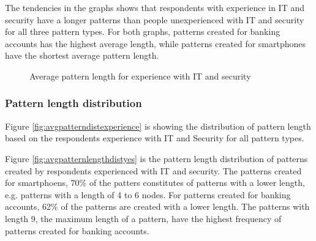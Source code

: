       The tendencies in the graphs shows that respondents with experience in IT and security have a longer patterns than people unexperienced with IT and security for all three pattern types. For both graphs, patterns created for banking accounts has the highest average length, while patterns created for smartphones have the shortest average pattern length. 

      \begin{figure}[H]
        \centering
        \caption{Average pattern length for experience with IT and security}
        \label{fig:avgpatternlengthexperience}
      \end{figure}

    \subsubsection{Pattern length distribution}

      Figure \ref{fig:avgpatterndistexperience} is showing the distribution of pattern length based on the respondents experience with IT and Security for all pattern types. 

      Figure \ref{fig:avgpatternlengthdistyes} is the pattern length distribution of patterns created by respondents experienced with IT and security. The patterns created for smartphoens, 70\% of the patters constitutes of patterns with a lower length, e.g. patterns with a length of 4 to 6 nodes. For patterns created for banking accounts, 62\% of the patterns are created with a lower length. The patterns with length 9, the maximum length of a pattern, have the highest frequency of patterns created for banking accounts. 

